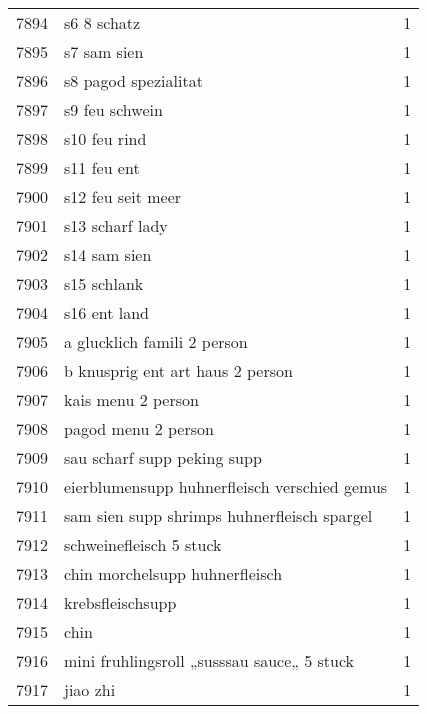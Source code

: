 \begin{tabular}{llr}
7894 &                                        s6 8 schatz &      1 \\
7895 &                                        s7 sam sien &      1 \\
7896 &                               s8 pagod spezialitat &      1 \\
7897 &                                     s9 feu schwein &      1 \\
7898 &                                       s10 feu rind &      1 \\
7899 &                                        s11 feu ent &      1 \\
7900 &                                  s12 feu seit meer &      1 \\
7901 &                                    s13 scharf lady &      1 \\
7902 &                                       s14 sam sien &      1 \\
7903 &                                        s15 schlank &      1 \\
7904 &                                       s16 ent land &      1 \\
7905 &                        a glucklich famili 2 person &      1 \\
7906 &                   b knusprig ent art haus 2 person &      1 \\
7907 &                                 kais menu 2 person &      1 \\
7908 &                                pagod menu 2 person &      1 \\
7909 &                        sau scharf supp peking supp &      1 \\
7910 &       eierblumensupp huhnerfleisch verschied gemus &      1 \\
7911 &        sam sien supp shrimps huhnerfleisch spargel &      1 \\
7912 &                            schweinefleisch 5 stuck &      1 \\
7913 &                     chin morchelsupp huhnerfleisch &      1 \\
7914 &                                   krebsfleischsupp &      1 \\
7915 &                                               chin &      1 \\
7916 &         mini fruhlingsroll „susssau sauce„ 5 stuck &      1 \\
7917 &                                           jiao zhi &      1 \\

\end{tabular}

